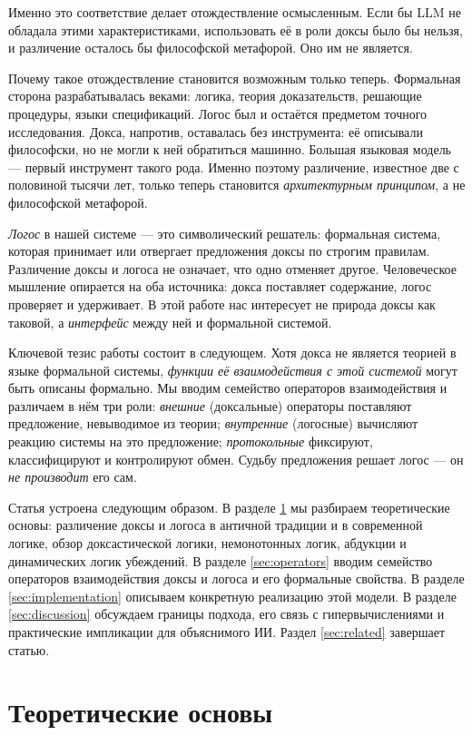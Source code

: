 \documentclass[12pt,a4paper]{article}
\begin{document}
Именно это соответствие делает отождествление осмысленным. Если бы LLM не обладала
этими характеристиками, использовать её в роли доксы было бы нельзя, и различение
осталось бы философской метафорой. Оно им не является.

Почему такое отождествление становится возможным только теперь. Формальная сторона
разрабатывалась веками: логика, теория доказательств, решающие процедуры, языки
спецификаций. Логос был и остаётся предметом точного исследования. Докса, напротив,
оставалась без инструмента: её описывали философски, но не могли к ней обратиться
машинно. Большая языковая модель --- первый инструмент такого рода. Именно поэтому
различение, известное две с половиной тысячи лет, только теперь становится
\emph{архитектурным принципом}, а не философской метафорой.

\emph{Логос} в нашей системе --- это символический решатель: формальная система,
которая принимает или отвергает предложения доксы по строгим правилам. Различение
доксы и логоса не означает, что одно отменяет другое. Человеческое мышление
опирается на оба источника: докса поставляет содержание, логос проверяет
и удерживает. В этой работе нас интересует не природа доксы как таковой, а
\emph{интерфейс} между ней и формальной системой.

Ключевой тезис работы состоит в следующем. Хотя докса не является теорией в языке
формальной системы, \emph{функции её взаимодействия с этой системой} могут быть
описаны формально. Мы вводим семейство операторов взаимодействия и различаем в нём
три роли: \emph{внешние} (доксальные) операторы поставляют предложение,
невыводимое из теории; \emph{внутренние} (логосные) вычисляют реакцию системы на
это предложение; \emph{протокольные} фиксируют, классифицируют и контролируют
обмен. Судьбу предложения решает логос --- он \emph{не производит} его сам.

Статья устроена следующим образом. В разделе \ref{sec:theory} мы разбираем теоретические основы:
различение доксы и логоса в античной традиции и в современной логике, обзор
доксастической логики, немонотонных логик, абдукции и динамических логик убеждений.
В разделе \ref{sec:operators} вводим семейство операторов взаимодействия доксы и логоса и его
формальные свойства. В разделе \ref{sec:implementation} описываем конкретную реализацию этой модели. В
разделе \ref{sec:discussion} обсуждаем границы подхода, его связь с гипервычислениями и практические
импликации для объяснимого ИИ. Раздел \ref{sec:related} завершает статью.

\section{Теоретические основы}
\label{sec:theory}
\end{document}

